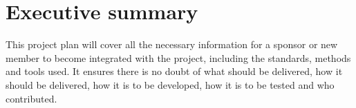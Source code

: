 \section{Executive summary}
\label{section:executive_summary}

This project plan will cover all the necessary information for a sponsor or new member to become integrated with the project, including the standards, methods and tools used. It ensures there is no doubt of what should be delivered, how it should be delivered, how it is to be developed, how it is to be tested and who contributed.



